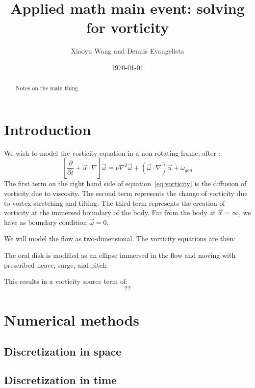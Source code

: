 \documentclass{amsart}
\title{Applied math main event: solving for vorticity}
\author{Xiaoyu Wang and Dennis Evangelista}
\date{\today}
\begin{document}
\begin{abstract}
Notes on the main thing. 
\end{abstract}
\maketitle
\tableofcontents

\section{Introduction}
We wish to model the vorticity equation in a non rotating frame, after \cite{Kundu:2004, Worf:2392}:
\begin{equation}
\left[\frac{\partial}{\partial t} + \vec{u}\cdot\nabla \right] \vec\omega = \nu \nabla^2 \vec\omega + (\vec\omega\cdot\nabla) \vec{u} + \dot\omega_{gen}
\label{eq:vorticity}
\end{equation}
The first term on the right hand side of equation~\ref{eq:vorticity} is the diffusion of vorticity due to viscosity.  The second term represents the change of vorticity due to vortex stretching and tilting.  The third term represents the creation of vorticity at the immersed boundary of the body.  Far from the body at $\vec{x}=\infty$, we have as boundary condition $\vec\omega = 0$.

We will model the flow as two-dimensional.  The vorticity equations are then:
\begin{equation}
\end{equation}

The oral disk is modified as an ellipse immersed in the flow and moving with prescribed heave, surge, and pitch:
\begin{equation}
\end{equation}

This results in a vorticity source term of:
\begin{equation}
??
\end{equation}

\section{Numerical methods}
\subsection{Discretization in space}
\subsection{Discretization in time}
\end{document}
